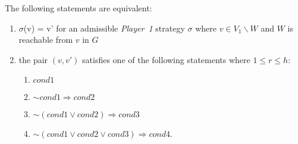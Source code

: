 \begin{theorem}
	\label{theorem2}
	The following statements are equivalent:
	\begin{enumerate}
		\item $\sigma$(v) = v' for an admissible \textit{Player~1} strategy $\sigma$ where $v \in V_{1} \backslash W$ and $W$ is reachable from $v$ in $G$
		\item the pair $(v,v')$ satisfies one of the following statements where $1 \leq r \leq h$:
		\begin{enumerate}
			\item $cond1$
			\item $\sim cond1 \Rightarrow cond2$
			\item $\sim(cond1 \vee cond2) \Rightarrow cond3$
			\item $\sim(cond1 \vee cond2 \vee cond3) \Rightarrow cond4$.
		\end{enumerate}
	\end{enumerate}
\end{theorem}

